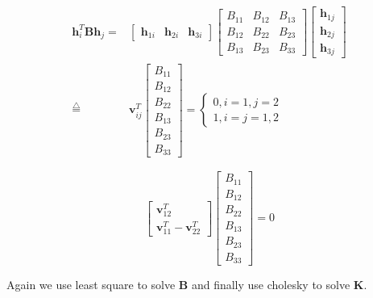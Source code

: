 \documentclass{article}
\theoremstyle{definition}
\begin{document}
	\begin{equation}
		\begin{aligned}
			\mathbf{h}_i^T \mathbf{B} \mathbf{h}_j = & \left[\begin{array}{lll}
				\mathbf{h}_{1 i} & \mathbf{h}_{2 i} & \mathbf{h}_{3 i}
			\end{array}\right]\left[\begin{array}{lll}
				B_{11} & B_{12} & B_{13} \\
				B_{12} & B_{22} & B_{23} \\
				B_{13} & B_{23} & B_{33}
			\end{array}\right]\left[\begin{array}{c}
				\mathbf{h}_{1 j} \\
				\mathbf{h}_{2 j} \\
				\mathbf{h}_{3 j}
			\end{array}\right] \\
		\stackrel{\triangle}{=}
		& \mathbf v_{ij}^T\left[\begin{array}{l}
				B_{11} \\
				B_{12} \\
				B_{22} \\
				B_{13} \\
				B_{23} \\
				B_{33}
			\end{array}\right]
		=\begin{cases}
		0, i = 1, j = 2\\
		1, i=j=1,2
	\end{cases}
		\end{aligned}
	\end{equation}
	
	\begin{equation}
	\left[\begin{array}{c}
		\mathbf{v}_{12}^T \\
		\mathbf{v}_{11}^T-\mathbf{v}_{22}^T
	\end{array}\right] \left[\begin{array}{l}
	B_{11} \\
	B_{12} \\
	B_{22} \\
	B_{13} \\
	B_{23} \\
	B_{33}
\end{array}\right]=0
	\end{equation}

	Again we use least square to solve $\mathbf B$ and finally use cholesky to solve $\mathbf K$.
	
\end{document}
